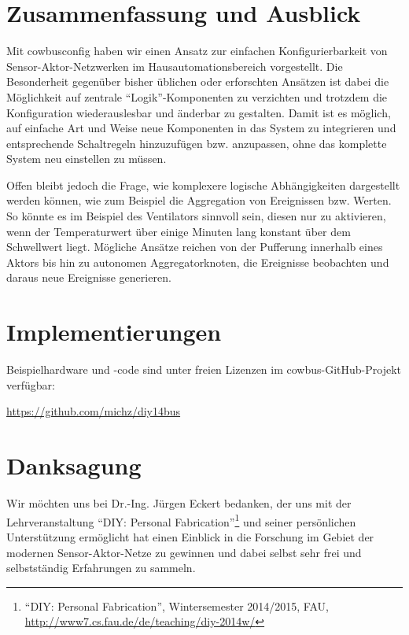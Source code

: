\documentclass[conference]{IEEEtran}
\begin{document}
\section{Zusammenfassung und Ausblick}
    Mit cowbusconfig haben wir einen Ansatz zur einfachen Konfigurierbarkeit
    von Sensor-Aktor-Netzwerken im Hausautomationsbereich vorgestellt.
    Die Besonderheit gegenüber bisher üblichen oder erforschten Ansätzen ist
    dabei die Möglichkeit auf zentrale \enquote{Logik}-Komponenten
    zu verzichten und trotzdem die Konfiguration wiederauslesbar und
    änderbar zu gestalten.
    Damit ist es möglich, auf einfache Art und Weise neue Komponenten in das
    System zu integrieren und entsprechende Schaltregeln hinzuzufügen bzw.
    anzupassen, ohne das komplette System neu einstellen zu müssen.

    Offen bleibt jedoch die Frage,
    wie komplexere logische Abhängigkeiten dargestellt werden können,
    wie zum Beispiel die Aggregation von Ereignissen bzw. Werten.
    So könnte es im Beispiel des Ventilators sinnvoll sein, diesen nur zu
    aktivieren, wenn der Temperaturwert über einige Minuten lang konstant über
    dem Schwellwert liegt.
    Mögliche Ansätze reichen von der Pufferung innerhalb eines Aktors
    bis hin zu autonomen Aggregatorknoten,
    die Ereignisse beobachten und daraus neue Ereignisse generieren.

    \vspace*{0.45cm}

\section*{Implementierungen}
    Beispielhardware und -code sind unter freien Lizenzen im
    cowbus-GitHub-Projekt verfügbar:

    \url{https://github.com/michz/diy14bus}

\section*{Danksagung}
    Wir möchten uns bei Dr.-Ing. Jürgen Eckert bedanken,
    der uns mit der Lehrveranstaltung
    \enquote{DIY: Personal Fabrication}\footnote{\enquote{DIY: Personal Fabrication},
        Wintersemester 2014/2015, FAU,
        \url{http://www7.cs.fau.de/de/teaching/diy-2014w/}}
    und seiner persönlichen Unterstützung ermöglicht hat
    einen Einblick in die Forschung im Gebiet der modernen
    Sensor-Aktor-Netze zu gewinnen und dabei selbst sehr frei
    und selbstständig Erfahrungen zu sammeln.
\end{document}
